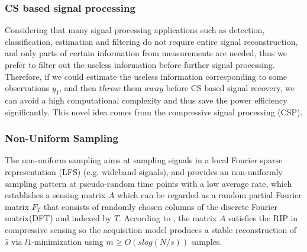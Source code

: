 \subsubsection{CS based signal processing}
Considering that many signal processing applications such as detection, classification, estimation and filtering do not require entire signal reconstruction, and only parts of certain information from measurements are needed, thus we prefer to filter out the useless information before further signal processing. Therefore, if we could estimate the useless information corresponding to some observations $y_I$, and then $throw$ them $away$ before CS based signal recovery, we can avoid a high computational complexity and thus save the power efficiency significantly. This novel idea comes from the compressive signal processing (CSP)\cite{davenport2010signal}.

\subsubsection{Non-Uniform Sampling}
The non-uniform sampling aims at sampling signals in a local Fourier sparse representation\cite{rauhut2010compressive} (LFS) (e.g. wideband signals), and provides an non-uniformly sampling pattern at pseudo-random time points with a low average rate, which establishes a sensing matrix $A$ which can be regarded as a random partial Fourier matrix $F_{T}$ that consists of randomly chosen columns of the discrete Fourier matrix(DFT) and indexed by $T$. According to \cite{ragheb2007implementation}, the matrix $A$ satisfies the RIP in compressive sensing so the acquisition model produces a stable reconstruction of $\hat s$ via $l1$-minimization using $m \geq O(slog(N/s))$ samples\cite{ragheb2007implementation}. 
